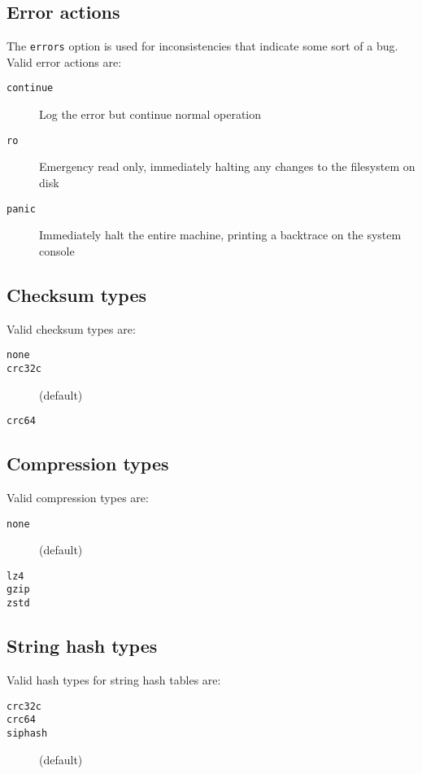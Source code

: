 \documentclass{article}
\begin{document}
\subsection{Error actions}
The \texttt{errors} option is used for inconsistencies that indicate some sort
of a bug. Valid error actions are:
\begin{description}
	\item[{\tt continue}] Log the error but continue normal operation
	\item[{\tt ro}] Emergency read only, immediately halting any changes
		to the filesystem on disk
	\item[{\tt panic}] Immediately halt the entire machine, printing a
		backtrace on the system console
\end{description}

\subsection{Checksum types}
Valid checksum types are:
\begin{description}
	\item[{\tt none}]
	\item[{\tt crc32c}] (default)
	\item[{\tt crc64}]
\end{description}

\subsection{Compression types}
Valid compression types are:
\begin{description}
	\item[{\tt none}] (default)
	\item[{\tt lz4}]
	\item[{\tt gzip}]
	\item[{\tt zstd}]
\end{description}

\subsection{String hash types}
Valid hash types for string hash tables are:
\begin{description}
	\item[{\tt crc32c}]
	\item[{\tt crc64}]
	\item[{\tt siphash}] (default)
\end{description}
\end{document}
